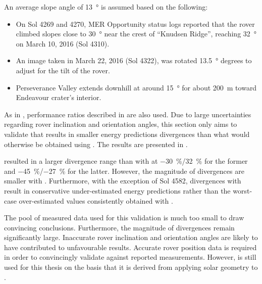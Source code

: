 An average slope angle of \SI{13}{\degree} is assumed based on the following:
\begin{itemize}
  \item On Sol 4269 and 4270, \ac{MER} Opportunity status logs reported that the rover climbed slopes close to \SI{30}{\degree} near the crest of ``Knudsen Ridge'', reaching \SI{32}{\degree} on March 10, 2016 (Sol 4310).
  \item An image taken in March 22, 2016 (Sol 4322), was rotated \SI{13.5}{\degree} degrees to adjust for the tilt of the rover.
  \item Perseverance Valley extends downhill at around \SI{15}{\degree} for about \SI{200}{\meter} toward Endeavour crater's interior.
\end{itemize}

As in , performance ratios described in  are also used. Due to large uncertainties regarding rover inclination and orientation angles, this section only aims to validate that  results in smaller energy predictions divergences than what would otherwise be obtained using . The results are presented in .



 resulted in a larger divergence range than with  at \SI{-30}{\percent}/\SI{32}{\percent} for the former and \SI{-45}{\percent}/\SI{-27}{\percent} for the latter. However, the magnitude of divergences are smaller with . Furthermore, with the exception of Sol 4582, divergences with  result in conservative under-estimated energy predictions rather than the worst-case over-estimated values consistently obtained with .

The pool of measured data used for this validation is much too small to draw convincing conclusions. Furthermore, the magnitude of divergences remain significantly large. Inaccurate rover inclination and orientation angles are likely to have contributed to unfavourable results. Accurate rover position data is required in order to convincingly validate  against reported measurements. However,  is still used for this thesis on the basis that it is derived from applying solar geometry to .

